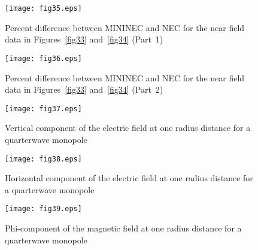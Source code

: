 \documentclass[12pt]{article}
\begin{document}
\begin{sidewaysfigure}[htb]
\centerline{\texttt{[image: fig35.eps]}}
\caption{Percent difference between MININEC and NEC for the near field
data in Figures~\ref{fig33} and~\ref{fig34} (Part~1)}
\label{fig35}
\end{sidewaysfigure}

\begin{sidewaysfigure}[htb]
\centerline{\texttt{[image: fig36.eps]}}
\caption{Percent difference between MININEC and NEC for the near field
data in Figures~\ref{fig33} and~\ref{fig34} (Part~2)}
\label{fig36}
\end{sidewaysfigure}

\begin{figure}[htb]
\centerline{\texttt{[image: fig37.eps]}}
\caption{Vertical component of the electric field at one radius distance
for a quarterwave monopole}
\label{fig37}
\end{figure}

\begin{figure}[htb]
\centerline{\texttt{[image: fig38.eps]}}
\caption{Horizontal component of the electric field at one radius distance
for a quarterwave monopole}
\label{fig38}
\end{figure}

\begin{figure}[htb]
\centerline{\texttt{[image: fig39.eps]}}
\caption{Phi-component of the magnetic field at one radius distance
for a quarterwave monopole}
\label{fig39}
\end{figure}
\end{document}
